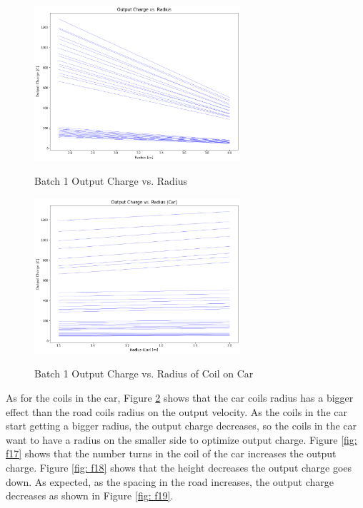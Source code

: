 \begin{figure}
    \begin{center}
    \includegraphics[width=3in]{fig15.png}
    \end{center}
    \renewcommand{\baselinestretch}{1}
    \small\normalsize
    \begin{quote}
    \caption[Batch 1 Output Charge vs. Radius]{Batch 1 Output Charge vs. Radius} \label{fig: f15}
    \end{quote}
\end{figure}

\begin{figure}
    \begin{center}
    \includegraphics[width=3in]{fig16.png}
    \end{center}
    \renewcommand{\baselinestretch}{1}
    \small\normalsize
    \begin{quote}
    \caption[Batch 1 Output Charge vs. Radius of Coil on Car]{Batch 1 Output Charge vs. Radius of Coil on Car} \label{fig: f16}
    \end{quote}
\end{figure}

As for the coils in the car, Figure \ref{fig: f16} shows that the car coils radius has a bigger effect than the road coils 
radius on the output velocity. As the coils in the car start getting a bigger radius, the output charge decreases, 
so the coils in the car want to have a radius on the smaller side to optimize output charge. 
Figure \ref{fig: f17} shows that the number turns in the coil of the car increases the output charge. 
Figure \ref{fig: f18} shows that the height decreases the output charge goes down. As expected, as the spacing in the road 
increases, the output charge decreases as shown in Figure \ref{fig: f19}. 

